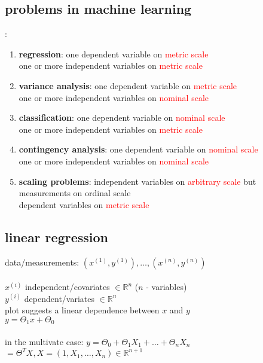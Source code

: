 \documentclass[a4paper, 12pt]{scrartcl}
\begin{document}
\subsection*{problems in machine learning}:
\begin{enumerate}[1.]
 \item \textbf{regression}: one dependent variable on \textcolor{red}{metric scale}\\
 one or more independent variables on \textcolor{red}{metric scale}
 \item \textbf{variance analysis}: one dependent variable on \textcolor{red}{metric scale}\\
 one or more independent variables on \textcolor{red}{nominal scale}
 \item \textbf{classification}: one dependent variable on \textcolor{red}{nominal scale}\\
 one or more independent variables on \textcolor{red}{metric scale}
 \item \textbf{contingency analysis}: one dependent variable on \textcolor{red}{nominal scale}\\
 one or more independent variables on \textcolor{red}{nominal scale}
 \item \textbf{scaling problems}: independent variables on \textcolor{red}{arbitrary scale} but measurements on ordinal scale\\
 dependent variables on \textcolor{red}{metric scale}
\end{enumerate}

\subsection*{linear regression}
data/measurements: $(x^{(1)}, y^{(1)}), \dots , (x^{(n)}, y^{(n)})$ \\\\
$x^{(i)}$ independent/covariates $\in \mathbb{R}^n$ ($n$ - variables)\\
$y^{(i)}$ dependent/variates $\in \mathbb{R}^n$\\
plot suggests a linear dependence between $x$ and $y$ \\
$y = \Theta_1 x + \Theta_0$\\\\
in the multivate case: $y = \Theta_0 + \Theta_1 X_1 + \dots + \Theta_n X_n$\\
$= \Theta^T X, X = (1, X_1, \dots ,X_n ) \in \mathbb{R}^{n+1}$\\\\
\end{document}
